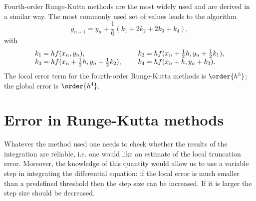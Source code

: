 Fourth-order Runge-Kutta methods are the most widely used and are
derived in a similar way. The most commonly used set of values leads
to the algorithm
%
\begin{equation}
  y_{n+1} = y_n + \frac{1}{6}(k_1+2k_2+2k_3+k_4),
  \label{IVP.eq:22}
\end{equation}
% 
with
%
\begin{equation}
  \begin{array}{ll@{\hspace{5mm}}l} 
    k_1=hf(x_n,y_n), & & 
    k_2=hf(x_n+\frac{1}{2}h,y_n+\frac{1}{2}k_1), \\
    k_3=hf(x_n+\frac{1}{2}h,y_n+\frac{1}{2}k_2), & & 
    k_4=hf(x_n+h,y_n+k_3).
  \end{array}
  \label{IVP.eq:23}
\end{equation}
% 
The local error term for the fourth-order Runge-Kutta methods is
$\order{h^5}$; the global error is $\order{h^4}$.

\section{Error in Runge-Kutta methods}

Whatever the method used one needs to check whether the results of the
integration are reliable, i.e. one would like an estimate of the local
truncation error.  Moreover, the knowledge of this quantity would
allow us to use a variable step in integrating the differential
equation: if the local error is much smaller than a predefined
threshold then the step size can be increased.  If it is larger the
step size should be decreased.

